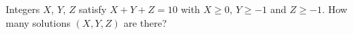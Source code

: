 Integers $X$, $Y$, $Z$ satisfy $X+Y+Z=10$ with $X\ge0$, $Y\ge-1$ and $Z\ge-1$. How many solutions $(X,Y,Z)$ are there?
